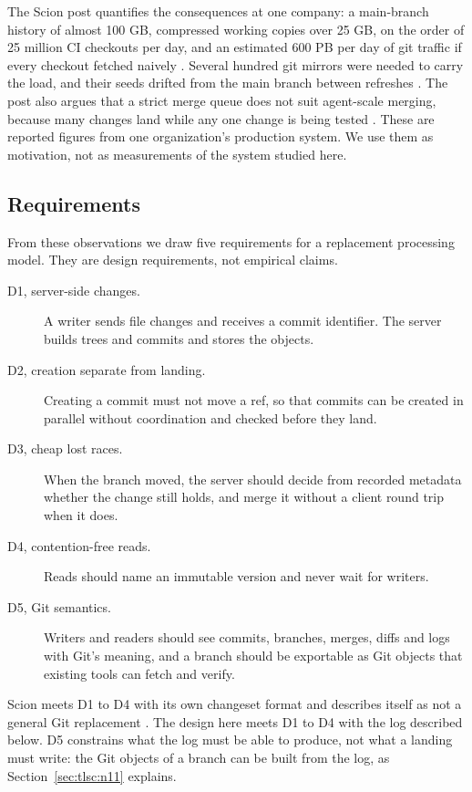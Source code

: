 \documentclass[11pt,letterpaper]{article}
\theoremstyle{definition}
\theoremstyle{remark}
\begin{document}
The Scion post quantifies the consequences at one company: a main-branch history of almost 100 GB, compressed working copies over 25 GB, on the order of 25 million CI checkouts per day, and an estimated 600 PB per day of git traffic if every checkout fetched naively \cite{anthropic2026scion}. %
Several hundred git mirrors were needed to carry the load, and their seeds drifted from the main branch between refreshes \cite{anthropic2026scion}. %
The post also argues that a strict merge queue does not suit agent-scale merging, because many changes land while any one change is being tested \cite{anthropic2026scion}. These are reported figures from one organization's production system. We use them as motivation, not as measurements of the system studied here.

\subsection{Requirements}

From these observations we draw five requirements for a replacement processing model. They are design requirements, not empirical claims.
\begin{description}
\item[D1, server-side changes.] A writer sends file changes and receives a commit identifier. The server builds trees and commits and stores the objects.
\item[D2, creation separate from landing.] Creating a commit must not move a ref, so that commits can be created in parallel without coordination and checked before they land.
\item[D3, cheap lost races.] When the branch moved, the server should decide from recorded metadata whether the change still holds, and merge it without a client round trip when it does.
\item[D4, contention-free reads.] Reads should name an immutable version and never wait for writers.
\item[D5, Git semantics.] Writers and readers should see commits, branches, merges, diffs and logs with Git's meaning, and a branch should be exportable as Git objects that existing tools can fetch and verify.
\end{description}
Scion meets D1 to D4 with its own changeset format and describes itself as not a general Git replacement \cite{anthropic2026scion}. The design here meets D1 to D4 with the log described below. D5 constrains what the log must be able to produce, not what a landing must write: the Git objects of a branch can be built from the log, as Section~\ref{sec:tlsc:n11} explains.
\end{document}
